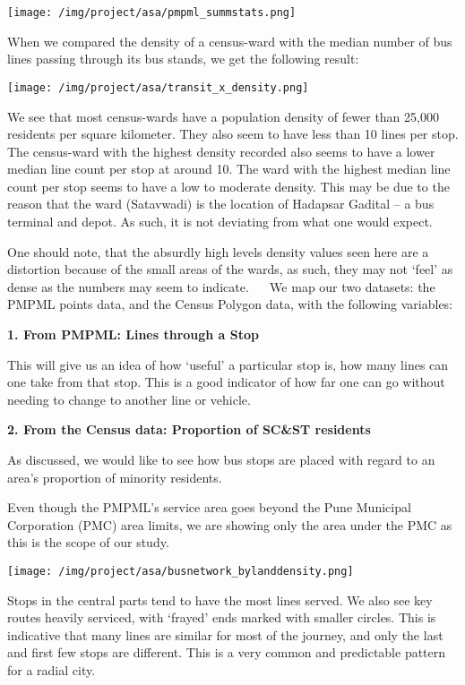 \documentclass[
]{article}
\begin{document}
\texttt{[image: /img/project/asa/pmpml\_summstats.png]}

When we compared the density of a census-ward with the median number of
bus lines passing through its bus stands, we get the following result:

\texttt{[image: /img/project/asa/transit\_x\_density.png]}

We see that most census-wards have a population density of fewer than
25,000 residents per square kilometer. They also seem to have less than
10 lines per stop. The census-ward with the highest density recorded
also seems to have a lower median line count per stop at around 10. The
ward with the highest median line count per stop seems to have a low to
moderate density. This may be due to the reason that the ward
(Satavwadi) is the location of Hadapsar Gadital -- a bus terminal and
depot. As such, it is not deviating from what one would expect.

One should note, that the absurdly high levels density values seen here
are a distortion because of the small areas of the wards, as such, they
may not `feel' as dense as the numbers may seem to indicate.   We map
our two datasets: the PMPML points data, and the Census Polygon data,
with the following variables:

\textbf{1. From PMPML: Lines through a Stop}

This will give us an idea of how `useful' a particular stop is, how many
lines can one take from that stop. This is a good indicator of how far
one can go without needing to change to another line or vehicle.

\textbf{2. From the Census data: Proportion of SC\&ST residents}

As discussed, we would like to see how bus stops are placed with regard
to an area's proportion of minority residents.

Even though the PMPML's service area goes beyond the Pune Municipal
Corporation (PMC) area limits, we are showing only the area under the
PMC as this is the scope of our study.

\texttt{[image: /img/project/asa/busnetwork\_bylanddensity.png]}

Stops in the central parts tend to have the most lines served. We also
see key routes heavily serviced, with `frayed' ends marked with smaller
circles. This is indicative that many lines are similar for most of the
journey, and only the last and first few stops are different. This is a
very common and predictable pattern for a radial city.
\end{document}
